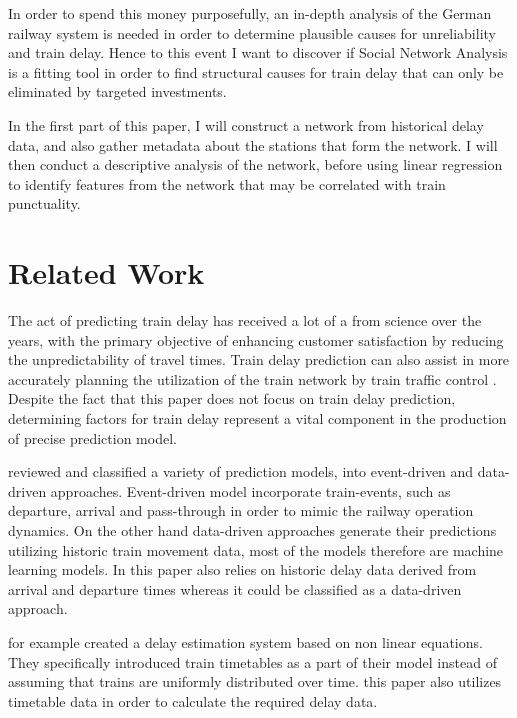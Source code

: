 \documentclass[12pt,a4paper]{article}
\begin{document}
In order to spend this money purposefully, an in-depth analysis of the German railway system is needed in order to determine plausible causes for unreliability and train delay. 
Hence to this event I want to discover if Social Network Analysis is a fitting tool in order to find structural causes for train delay that can only be eliminated by targeted investments. 

In the first part of this paper, I will construct a network from historical delay data, and also gather metadata about the stations that form the network. 
I will then conduct a descriptive analysis of the network, before using linear regression to identify features from the network that may be correlated with train punctuality.

\maketitle
\section{\label{sec:Related}Related Work}

The act of predicting train delay has received a lot of a from science over the years, with the primary objective of enhancing customer satisfaction by reducing the unpredictability of travel times. 
Train delay prediction can also assist in more accurately planning the utilization of the train network by train traffic control \citep{Spanninger2022}. 
Despite the fact that this paper does not focus on train delay prediction, determining factors for train delay represent a vital component in the production of precise prediction model.

\cite{Spanninger2022} reviewed and classified a variety of prediction models, into event-driven and data-driven approaches. 
Event-driven model incorporate train-events, such as departure, arrival and pass-through in order to mimic the railway operation dynamics. 
On the other hand data-driven approaches generate their predictions utilizing historic train movement data, most of the models therefore are machine learning models. 
In this paper also relies on historic delay data derived from arrival and departure times whereas it could be classified as a data-driven approach. 

\cite{Cheng90} for example created a delay estimation system based on non linear equations. 
They specifically introduced train timetables as a part of their model instead of assuming that trains are uniformly distributed over time. 
this paper also utilizes timetable data in order to calculate the required delay data.
\end{document}
